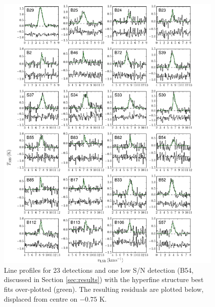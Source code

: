 \documentclass[iop,twocolappendix]{emulateapj}
\begin{document}
\begin{appendix}
\begin{figure}
\includegraphics[width=18.5cm]{AllN2D.pdf}
\caption{Line profiles for 23 {\NtD} detections and one low S/N detection (B54, discussed in Section \ref{sec:results}) with the hyperfine structure best fits over-plotted (green). The resulting residuals are plotted below, displaced from centre on $-0.75$ K.}
\label{fig:alln2dprofiles}
\end{figure}


\end{appendix}
\end{document}
